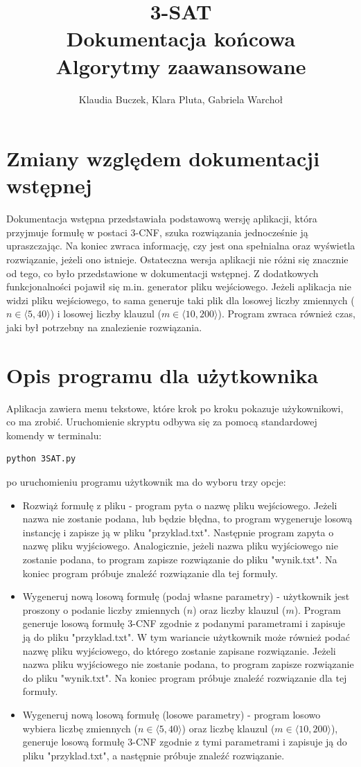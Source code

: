 \documentclass[11pt,a4paper]{article}
\title{3-SAT \\ Dokumentacja końcowa \\ \large Algorytmy zaawansowane}
\author{Klaudia Buczek, Klara Pluta, Gabriela Warchoł}
\date{}
\theoremstyle{definition}
\begin{document}
\maketitle

\section{Zmiany względem dokumentacji wstępnej}
Dokumentacja wstępna przedstawiała podstawową wersję aplikacji, która przyjmuje formułę w postaci 3-CNF, szuka rozwiązania jednocześnie ją upraszczając. Na koniec zwraca informację, czy jest ona spełnialna oraz wyświetla rozwiązanie, jeżeli ono istnieje. Ostateczna wersja aplikacji nie różni się znacznie od tego, co było przedstawione w dokumentacji wstępnej. Z dodatkowych funkcjonalności pojawił się m.in. generator pliku wejściowego. Jeżeli aplikacja nie widzi pliku wejściowego, to sama generuje taki plik dla losowej liczby zmiennych ($n \in \langle 5, 40 \rangle$) i losowej liczby klauzul ($m \in \langle 10, 200 \rangle$). Program zwraca również czas, jaki był potrzebny na znalezienie rozwiązania.

\section{Opis programu dla użytkownika}

Aplikacja zawiera menu tekstowe, które krok po kroku pokazuje użykownikowi, co ma zrobić. Uruchomienie skryptu odbywa się za pomocą standardowej komendy w terminalu:
\begin{verbatim}python 3SAT.py\end{verbatim}
po uruchomieniu programu użytkownik ma do wyboru trzy opcje:
\begin{itemize}
    \item Rozwiąż formułę z pliku - program pyta o nazwę pliku wejściowego. Jeżeli nazwa nie zostanie podana, lub będzie błędna, to program wygeneruje losową instancję i zapisze ją w pliku "przyklad.txt". Następnie program zapyta o nazwę pliku wyjściowego. Analogicznie, jeżeli nazwa pliku wyjściowego nie zostanie podana, to program zapisze rozwiązanie do pliku "wynik.txt". Na koniec program próbuje znaleźć rozwiązanie dla tej formuły.
    \item Wygeneruj nową losową formułę (podaj własne parametry) - użytkownik jest proszony o podanie liczby zmiennych ($n$) oraz liczby klauzul ($m$). Program generuje losową formułę 3-CNF zgodnie z podanymi parametrami i zapisuje ją do pliku "przyklad.txt". W tym wariancie użytkownik może również podać nazwę pliku wyjściowego, do którego zostanie zapisane rozwiązanie. Jeżeli nazwa pliku wyjściowego nie zostanie podana, to program zapisze rozwiązanie do pliku "wynik.txt". Na koniec program próbuje znaleźć rozwiązanie dla tej formuły.
    \item Wygeneruj nową losową formułę (losowe parametry) - program losowo wybiera liczbę zmiennych ($n \in \langle 5, 40 \rangle$) oraz liczbę klauzul ($m \in \langle 10, 200 \rangle$), generuje losową formułę 3-CNF zgodnie z tymi parametrami i zapisuje ją do pliku "przyklad.txt", a następnie próbuje znaleźć rozwiązanie.
\end{itemize}
\end{document}

